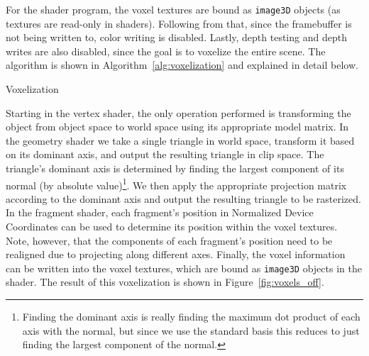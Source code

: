For the shader program, the voxel textures are bound as \texttt{image3D} objects (as textures are read-only in shaders). Following from that, since the framebuffer is not being written to, color writing is disabled. Lastly, depth testing and depth writes are also disabled, since the goal is to voxelize the entire scene. The algorithm is shown in Algorithm~\ref{alg:voxelization} and explained in detail below.

\begin{algorithm}
    \caption{Voxelization}
    \label{alg:voxelization}
    \begin{algorithmic}
        \EndFor
         
        \EndFor
    \end{algorithmic}
\end{algorithm}

Starting in the vertex shader, the only operation performed is transforming the object from object space to world space using its appropriate model matrix. In the geometry shader we take a single triangle in world space, transform it based on its dominant axis, and output the resulting triangle in clip space. The triangle's dominant axis is determined by finding the largest component of its normal (by absolute value)\footnote{Finding the dominant axis is really finding the maximum dot product of each axis with the normal, but since we use the standard basis this reduces to just finding the largest component of the normal.}. We then apply the appropriate projection matrix according to the dominant axis and output the resulting triangle to be rasterized. In the fragment shader, each fragment's position in Normalized Device Coordinates can be used to determine its position within the voxel textures. Note, however, that the components of each fragment's position need to be realigned due to projecting along different axes. Finally, the voxel information can be written into the voxel textures, which are bound as \texttt{image3D} objects in the shader. The result of this voxelization is shown in Figure~\ref{fig:voxels_off}.

